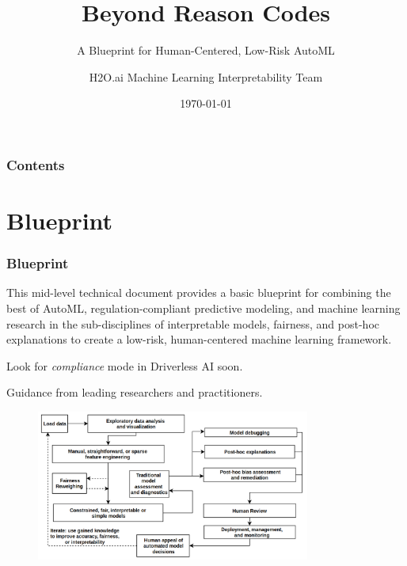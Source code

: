 \documentclass[11pt,
               aspectratio=169,
               hyperref={colorlinks}
               ]{beamer}
\author{H2O.ai Machine Learning Interpretability Team}
\title{Beyond Reason Codes}
\subtitle{A Blueprint for Human-Centered, Low-Risk AutoML}
\institute{\href{https://www.h2o.ai}{H\textsubscript{2}O.ai}}
\date{\today}
\begin{document}
	
	\maketitle
	
	\begin{frame}
	
		\frametitle{Contents}
		
		\tableofcontents{}
		
	\end{frame}

	\section{Blueprint}
	
		\begin{frame}[allowframebreaks]
		
			\frametitle{Blueprint}			
			
			This mid-level technical document provides a basic blueprint for combining the best of AutoML, regulation-compliant predictive modeling, and machine learning research in the sub-disciplines of interpretable models, fairness, and post-hoc explanations to create a low-risk, human-centered machine learning framework.\\
			
			\vspace{10pt}			
			
			Look for \textit{compliance} mode in Driverless AI soon.
			
			\vspace{10pt}			
			
			Guidance from leading researchers and practitioners.
							
			\framebreak								
							
			\begin{figure}[htb]
				\begin{center}
					\includegraphics[height=140pt]{img/blueprint.png}
					\label{fig:blueprint}
				\end{center}
			\end{figure}		
		
		\end{frame}
\end{document}

